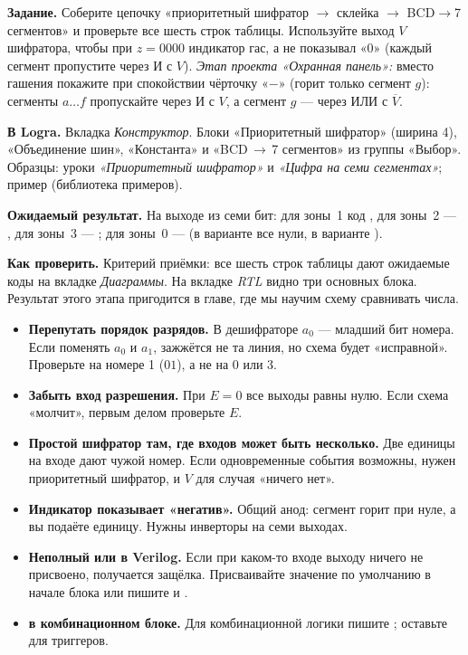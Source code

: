 \begin{diybox}
\textbf{Задание.}  Соберите цепочку «приоритетный шифратор
$\to$ склейка $\to$ BCD$\to$7 сегментов» и проверьте все шесть
строк таблицы.  Используйте выход $V$ шифратора, чтобы при
$z=0000$ индикатор гас, а не показывал «0» (каждый сегмент пропустите
через И с $V$).  \emph{Этап проекта «Охранная панель»:} вместо
гашения покажите при спокойствии чёрточку «$-$» (горит только сегмент
$g$): сегменты $a\ldots f$ пропускайте через И с $V$, а сегмент $g$ ---
через ИЛИ с $\overline V$.

\textbf{В Logra.} Вкладка \emph{Конструктор}. Блоки «Приоритетный
шифратор» (ширина 4), «Объединение шин», «Константа» и «BCD\,$\to$\,7
сегментов» из группы «Выбор». Образцы: уроки \emph{«Приоритетный
шифратор»} и \emph{«Цифра на семи сегментах»}; пример
 (библиотека примеров).

\textbf{Ожидаемый результат.} На выходе из семи бит: для зоны~1 код
, для зоны~2 --- , для зоны~3 ---
; для зоны~0 ---  (в варианте 
все нули, в варианте  ).

\textbf{Как проверить.} Критерий приёмки: все шесть строк таблицы дают
ожидаемые коды на вкладке \emph{Диаграммы}. На вкладке \emph{RTL} видно
три основных блока. Результат этого этапа пригодится в главе, где
мы научим схему сравнивать числа.
\end{diybox}

\begin{warnbox}
\begin{itemize}
  \item \textbf{Перепутать порядок разрядов.} В дешифраторе $a_0$ --- младший
        бит номера. Если поменять $a_0$ и $a_1$, зажжётся не та линия, но
        схема будет «исправной». Проверьте на номере 1 ($01$), а не на 0 или 3.
  \item \textbf{Забыть вход разрешения.} При $E=0$ все выходы равны нулю.
        Если схема «молчит», первым делом проверьте $E$.
  \item \textbf{Простой шифратор там, где входов может быть несколько.}
        Две единицы на входе дают чужой номер. Если одновременные события
        возможны, нужен приоритетный шифратор, и $V$ для случая «ничего нет».
  \item \textbf{Индикатор показывает «негатив».} Общий анод: сегмент
        горит при нуле, а вы подаёте единицу. Нужны инверторы на семи
        выходах.
  \item \textbf{Неполный  или  в Verilog.} Если при
        каком-то входе выходу ничего не присвоено, получается защёлка.
        Присваивайте значение по умолчанию в начале блока  или
        пишите  и .
  \item \textbf{\code{<=} в комбинационном блоке.} Для комбинационной
        логики пишите \code{=}; \code{<=} оставьте для триггеров.
\end{itemize}
\end{warnbox}

